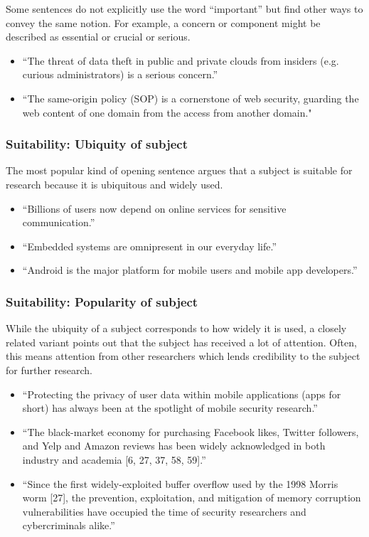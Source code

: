 \documentclass[sigconf]{acmart}
\begin{document}
	Some sentences do not explicitly use the word “important” but find other ways to convey the same notion. For example, a concern or component might be described as essential or crucial or serious.
	\begin{itemize}
		\item 	``The threat of data theft in public and private clouds from insiders (e.g. curious administrators) is a serious concern.''~\cite{dinh2015m2r}

		\item 	``The same-origin policy (SOP) is a cornerstone of web security, guarding the web content of one domain from the access from another domain."~\cite{zheng2015cookies}
	\end{itemize}


	\subsubsection{Suitability: Ubiquity of subject}

	The most popular kind of opening sentence argues that a subject is suitable for research because it is ubiquitous and widely used.
	\begin{itemize}
		\item ``Billions of users now depend on online services for sensitive communication.''~\cite{melara2015coniks}

		\item	``Embedded systems are omnipresent in our everyday life.''~\cite{costin2014large}

		\item	``Android is the major platform for mobile users and mobile app developers.''~\cite{oltrogge2015pin}
	\end{itemize}


	\subsubsection{Suitability: Popularity of subject}

	While the ubiquity of a subject corresponds to how widely it is used, a closely related variant points out that the subject has received a lot of attention. Often, this means attention from other researchers which lends credibility to the subject for further research.
	\begin{itemize}
		\item	``Protecting the privacy of user data within mobile applications (apps for short) has always been at the spotlight of mobile security research.''~\cite{nan2015uipicker}

		\item	``The black-market economy for purchasing Facebook likes, Twitter followers, and Yelp and Amazon reviews has been widely acknowledged in both industry and academia [6, 27, 37, 58, 59].''~\cite{viswanath2014towards}

		\item	``Since the first widely-exploited buffer overflow used by the 1998 Morris worm [27], the prevention, exploitation, and mitigation of memory corruption vulnerabilities have occupied the time of security researchers and cybercriminals alike.''~\cite{di2015elf}
	\end{itemize}
\end{document}
